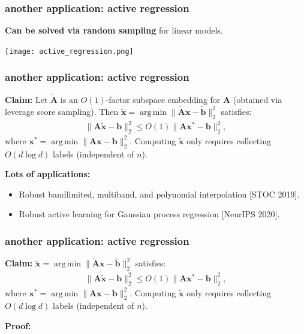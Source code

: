 \documentclass[compress]{beamer}
\newcommand{\bv}[1]{\mathbf{#1}}
\DeclareMathOperator*{\argmin}{arg\,min}
\begin{document}
\begin{frame}[t]
	\frametitle{another application: active regression}	
\textbf{Can be solved via random sampling} for linear models.
	\begin{center}
		\texttt{[image: active\_regression.png]}
	\end{center}
\end{frame}	

\begin{frame}[t]
	\frametitle{another application: active regression}	
	\textbf{Claim:} Let $\tilde{\bv{A}}$ is an $O(1)$-factor subspace embedding for $\bv{A}$ (obtained via leverage score sampling). Then $\tilde{\bv{x}} = \argmin \|\tilde{\bv{A}}\bv{x} - \tilde{\bv{b}}\|_2^2$ satisfies:
	\begin{align*}
		\|\bv{A}\tilde{\bv{x}} - \bv{b}\|_2^2 \leq O(1) \|\bv{A}\bv{x}^* - \bv{b}\|_2^2, 
	\end{align*}
where $\bv{x}^* = \argmin \|{\bv{A}}\bv{x} - \bv{b}\|_2^2$. Computing $\tilde{\bv{x}}$ only requires collecting $O(d\log d)$ labels (independent of $n$). 

\textbf{Lots of applications:}
\begin{itemize}
	\item Robust bandlimited, multiband, and polynomial interpolation [STOC 2019].
	\item Robust active learning for Gaussian process regression [NeurIPS 2020].
\end{itemize}
	
\end{frame}

\begin{frame}[t]
	\frametitle{another application: active regression}	
	\textbf{Claim:} $\tilde{\bv{x}} = \argmin \|\tilde{\bv{A}}\bv{x} - \tilde{\bv{b}}\|_2^2$ satisfies:
	\begin{align*}
		\|\bv{A}\tilde{\bv{x}} - \bv{b}\|_2^2 \leq O(1) \|\bv{A}\bv{x}^* - \bv{b}\|_2^2, 
	\end{align*}
	where $\bv{x}^* = \argmin \|{\bv{A}}\bv{x} - \bv{b}\|_2^2$. Computing $\tilde{\bv{x}}$ only requires collecting $O(d\log d)$ labels (independent of $n$). 
	
	\textbf{Proof:}
	
\end{frame}
\end{document}
